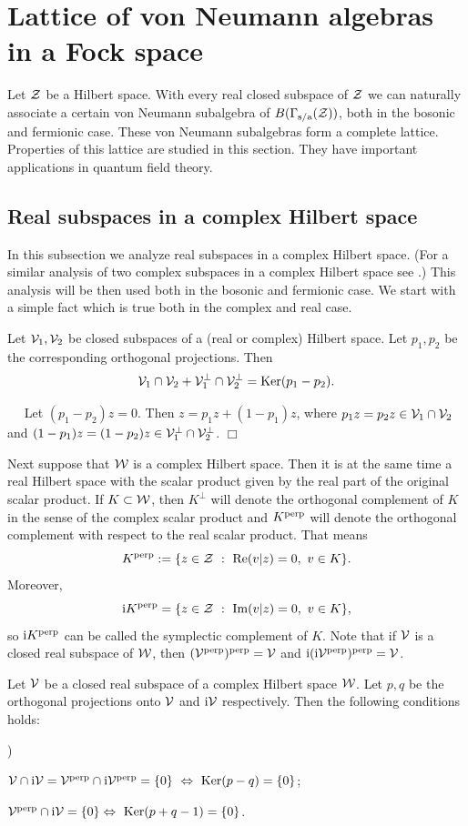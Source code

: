 \documentclass{svmult}
\newcounter{smallarabics}
\newenvironment{arabicenumerate}
{\begin{list}{{\normalfont\textrm{\arabic{smallarabics})}}}
  {\usecounter{smallarabics}\setlength{\itemindent}{0cm}
   \setlength{\leftmargin}{5ex}\setlength{\labelwidth}{4ex}
   \setlength{\topsep}{0.75\parsep}\setlength{\partopsep}{0ex}
   \setlength{\itemsep}{0ex}}}
{\end{list}}
\newcommand{\ben}{\begin{arabicenumerate}}
\newcommand{\een}{\end{arabicenumerate}}
\def\bel{\begin{lemma}}
\def\eel{\end{lemma}}
\def\bet{\begin{theorem}}
\def\eet{\end{theorem}}
\def\Im{{\rm Im}}
\def\Re{{\rm Re}}
\def\perpr{{\rm perp}}
\def\sa{{\rm s/a}}
\def\proof{
\noindent{\bf Proof.}\ \ }
\def\cZ{{\cal Z}}
\def\cV{{\cal V}}
\def\cW{{\cal W}}
\def\i{{\rm i}}
\def\Ker{{\rm Ker}}
\def\qed{$\Box$\medskip}
\def\Ker{{\rm Ker}}
\begin{document}
\section{Lattice of von Neumann algebras in a Fock space}


Let $\cZ$ be a Hilbert space. With every real closed subspace of $\cZ$ we can
naturally associate a certain von Neumann 
subalgebra of $B(\Gamma_\sa(\cZ))$,
both in the bosonic and fermionic case. These von Neumann subalgebras form a
 complete lattice. Properties of this lattice are studied in
this section. They have important applications in quantum field theory.




\subsection{Real subspaces in a complex Hilbert space}



In this subsection
we analyze  real subspaces in a complex Hilbert space.
(For a similar analysis of two complex subspaces in a complex Hilbert space
see \cite{Di,Hal}.)
This analysis
will be then used both in the bosonic and fermionic case.
We start with a simple fact which is true both in the complex and real case.
 
\bel Let $\cV_1,\cV_2$ be  closed subspaces
 of a (real or complex) Hilbert space.
 Let $p_1,p_2$ be the corresponding orthogonal projections.
Then \[
\cV_1\cap\cV_2+\cV_1^\perp\cap\cV_2^\perp=\Ker(p_1-p_2).\]
\eel

\proof
 Let $(p_1-p_2)z=0$.
Then $z=p_1z+(1-p_1)z$, where
$p_1z=p_2z\in\cV_1\cap\cV_2$ and
$(1-p_1)z=(1-p_2)z\in \cV_1^\perp\cap\cV_2^\perp$. \qed


Next suppose that $\cW$ is a complex Hilbert space. Then it is at the same
time a real Hilbert space with the scalar product given by the real part of
the original scalar product. If $K\subset\cW$, then $K^\perp$ will denote the
orthogonal complement of $K$ in the sense of the complex scalar product and
$K^\perpr$ will denote the orthogonal complement with respect to the real
scalar product. That means
\[ K^{\perpr}:=\{z\in\cZ\ :\ \Re(v| z)=0,\ v\in K\}.\]
Moreover, 
\[\i K^{\perpr}=\{z\in\cZ\ :\ \Im(v| z)=0,\ v\in K\},\]
so $\i K^{\perpr}$ can be called the symplectic  complement of
$K$.
Note that if $\cV$ is a closed real subspace of $\cW$, then
 $(\cV^{\perpr})^{\perpr}=\cV$ and
 $\i(\i\cV^{\perpr})^{\perpr}=\cV$.


\bet Let $\cV$ be a closed
real subspace of a complex Hilbert space $
\cW$.
Let $p, q$ be the orthogonal projections onto $\cV$ and $\i\cV$ respectively. Then
the following conditions holds:
\ben\item
 $\cV\cap\i\cV=\cV^\perpr\cap\i\cV^\perpr=\{0\}\ \Leftrightarrow
\ \Ker (p-q)=\{0\}$;
\item $\cV^\perpr\cap\i\cV=\{0\}\Leftrightarrow\ 
\Ker(p+q-1)=\{0\}$.\een
\eet
\end{document}
